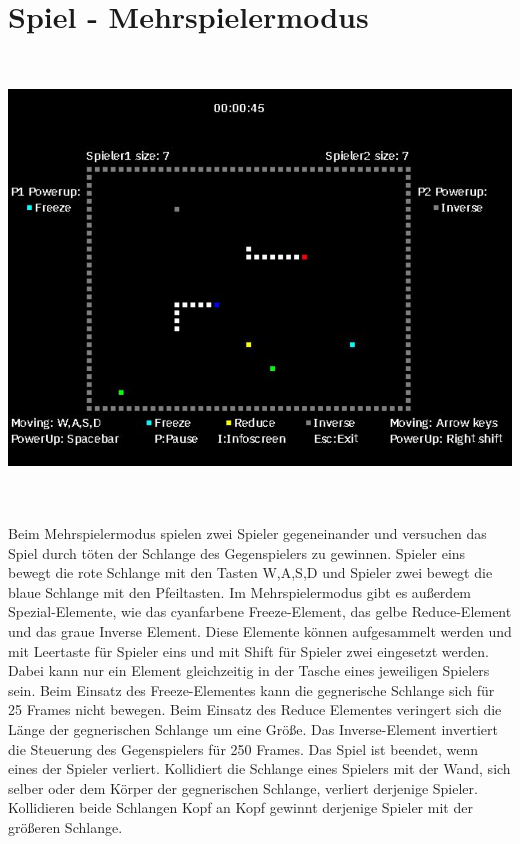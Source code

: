 \section{Spiel - Mehrspielermodus}
\label{Spiel_-_Mehrspielermodus}
%
\textcolor{white}{easily}
\newline 
\begin{minipage}[X]{1.0\textwidth}
 \centering
 \includegraphics[scale=0.5]{bilder/Mehrspielermodus}
 \label{fig:mehrspielermodus}
\end{minipage}
\\ \\ 
	Beim Mehrspielermodus spielen zwei Spieler gegeneinander und versuchen das Spiel durch t{\"o}ten der Schlange des Gegenspielers zu gewinnen. Spieler eins bewegt die rote Schlange mit den Tasten W,A,S,D und Spieler zwei bewegt die blaue Schlange mit den Pfeiltasten. Im Mehrspielermodus gibt es au{\ss}erdem Spezial-Elemente, wie das cyanfarbene Freeze-Element, das gelbe Reduce-Element und das graue Inverse Element. Diese Elemente k{\"o}nnen aufgesammelt werden und mit Leertaste f{\"u}r Spieler eins und mit Shift f{\"u}r Spieler zwei eingesetzt werden. Dabei kann nur ein Element gleichzeitig in der Tasche eines jeweiligen Spielers sein. Beim Einsatz des Freeze-Elementes kann die gegnerische Schlange sich f{\"u}r 25 Frames nicht bewegen. Beim Einsatz des Reduce Elementes veringert sich die L{\"a}nge der gegnerischen Schlange um eine Gr{\"o}{\ss}e. Das Inverse-Element invertiert die Steuerung des Gegenspielers f{\"u}r 250 Frames. Das Spiel ist beendet, wenn eines der Spieler verliert. Kollidiert die Schlange eines Spielers mit der Wand, sich selber oder dem K{\"o}rper der gegnerischen Schlange, verliert derjenige Spieler. Kollidieren beide Schlangen Kopf an Kopf gewinnt derjenige Spieler mit der gr{\"o}{\ss}eren Schlange.  


